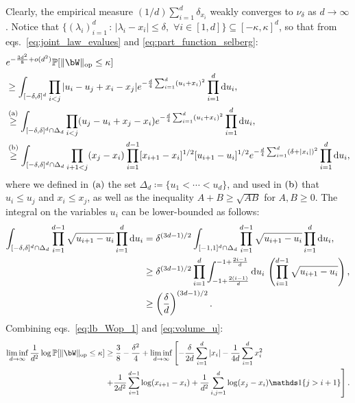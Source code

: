 \myskip
Clearly, the empirical measure $(1/d)\sum_{i=1}^d \delta_{x_i}$ weakly converges to $\nu_\delta$ as $d \to \infty$.
Notice that $\{(\lambda_i)_{i=1}^d \, : \, |\lambda_i - x_i| \leq \delta, \, \, \forall i \in [1,d]\} \subseteq [-\kappa,\kappa]^d$, 
so that from eqs.~\eqref{eq:joint_law_evalues} and \eqref{eq:part_function_selberg}:
\begin{align}
    \label{eq:lb_Wop_1}
   &e^{-\frac{3d^2}{8} + \smallO(d^2)} \bbP[\|\bW\|_\op \leq \kappa] \\ 
    \nonumber
   &\geq \int_{[-\delta,\delta]^d} \prod_{i < j} |u_i - u_j + x_i - x_j| e^{-\frac{d}{4} \sum_{i=1}^d (u_i + x_i)^2} \prod_{i=1}^d \rd u_i,\\ 
    \nonumber
   &\ageq \int_{[-\delta,\delta]^d \cap \Delta_d} \prod_{i < j} (u_j - u_i + x_j - x_i) e^{-\frac{d}{4} \sum_{i=1}^d (u_i + x_i)^2} \prod_{i=1}^d \rd u_i, \\
    \nonumber
   &\bgeq \int_{[-\delta,\delta]^d \cap \Delta_d} \prod_{i + 1< j} (x_j - x_i) \prod_{i=1}^{d-1} [x_{i+1} - x_{i}]^{1/2} [u_{i+1} - u_i]^{1/2} e^{-\frac{d}{4} \sum_{i=1}^d (\delta + |x_i|)^2} \prod_{i=1}^d \rd u_i,
\end{align}
where we defined in $(\rm a)$ the set $\Delta_d \coloneqq \{u_1 < \cdots < u_d\}$, and used 
in $(\rm b)$ that $u_i \leq u_j$ and $x_i \leq x_j$, as well as the inequality $A+B \geq \sqrt{AB}$ for $A, B \geq 0$.
The integral on the variables $u_i$ can be lower-bounded as follows:
\begin{align}\label{eq:volume_u}
    \nonumber
    \int_{[-\delta,\delta]^d \cap \Delta_d} \prod_{i=1}^{d-1} \sqrt{u_{i+1} - u_i} \prod_{i=1}^d \mathrm{d} u_i 
    &= \delta^{(3d-1)/2} \int_{[-1,1]^d \cap \Delta_d} \prod_{i=1}^{d-1} \sqrt{u_{i+1} - u_i} \prod_{i=1}^d \mathrm{d} u_i , \\ 
    \nonumber
    &\geq \delta^{(3d-1)/2} \prod_{i=1}^{d} \int_{-1 + \frac{2(i-1)}{d}}^{-1 + \frac{2i-1}{d}} \mathrm{d} u_i \, \left(\prod_{i=1}^{d-1} \sqrt{u_{i+1} - u_i}\right) , \\ 
    &\geq \left(\frac{\delta}{d}\right)^{(3d-1)/2}.
\end{align}
Combining eqs.~\eqref{eq:lb_Wop_1} and \eqref{eq:volume_u}: 
\begin{align*}
    \liminf_{d \to \infty} \frac{1}{d^2} \log \bbP[\|\bW\|_\op \leq \kappa]  
    &\geq \frac{3}{8} - \frac{\delta^2}{4}
    + \liminf_{d \to \infty} \left[-\frac{\delta}{2d} \sum_{i=1}^d |x_i| -\frac{1}{4d} \sum_{i=1}^d x_i^2\right. \\ 
    &\left.+ \frac{1}{2d^2} \sum_{i=1}^{d-1} \log (x_{i+1} - x_i) + \frac{1}{d^2} \sum_{i,j=1}^d \log(x_j - x_i) \indi\{j > i+1\}
    \right].
\end{align*}
